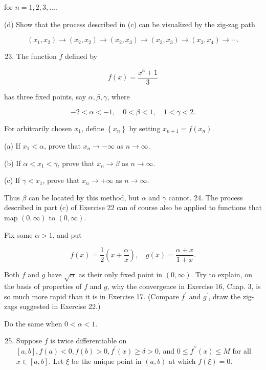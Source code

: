 \documentclass[10pt]{article}
\begin{document}
for $n=1,2,3, \ldots$.

(d) Show that the process described in (c) can be visualized by the zig-zag path

$$
\left(x_{1}, x_{2}\right) \rightarrow\left(x_{2}, x_{2}\right) \rightarrow\left(x_{2}, x_{3}\right) \rightarrow\left(x_{3}, x_{3}\right) \rightarrow\left(x_{3}, x_{4}\right) \rightarrow \cdots .
$$

\begin{enumerate}
  \setcounter{enumi}{22}
  \item The function $f$ defined by
\end{enumerate}

$$
f(x)=\frac{x^{3}+1}{3}
$$

has three fixed points, say $\alpha, \beta, \gamma$, where

$$
-2<\alpha<-1, \quad 0<\beta<1, \quad 1<\gamma<2 .
$$

For arbitrarily chosen $x_{1}$, define $\left\{x_{n}\right\}$ by setting $x_{n+1}=f\left(x_{n}\right)$.

(a) If $x_{1}<\alpha$, prove that $x_{n} \rightarrow-\infty$ as $n \rightarrow \infty$.

(b) If $\alpha<x_{1}<\gamma$, prove that $x_{n} \rightarrow \beta$ as $n \rightarrow \infty$.

(c) If $\gamma<x_{1}$, prove that $x_{n} \rightarrow+\infty$ as $n \rightarrow \infty$.

Thus $\beta$ can be located by this method, but $\alpha$ and $\gamma$ cannot. 24. The process described in part (c) of Exercise 22 can of course also be applied to functions that map $(0, \infty)$ to $(0, \infty)$.

Fix some $\alpha>1$, and put

$$
f(x)=\frac{1}{2}\left(x+\frac{\alpha}{x}\right), \quad g(x)=\frac{\alpha+x}{1+x} .
$$

Both $f$ and $g$ have $\sqrt{\alpha}$ as their only fixed point in $(0, \infty)$. Try to explain, on the basis of properties of $f$ and $g$, why the convergence in Exercise 16, Chap. 3, is so much more rapid than it is in Exercise 17. (Compare $f^{\prime}$ and $g^{\prime}$, draw the zig-zags suggested in Exercise 22.)

Do the same when $0<\alpha<1$.

\begin{enumerate}
  \setcounter{enumi}{24}
  \item Suppose $f$ is twice differentiable on $[a, b], f(a)<0, f(b)>0, f^{\prime}(x) \geq \delta>0$, and $0 \leq f^{\prime \prime}(x) \leq M$ for all $x \in[a, b]$. Let $\xi$ be the unique point in $(a, b)$ at which $f(\xi)=0$.
\end{enumerate}
\end{document}
